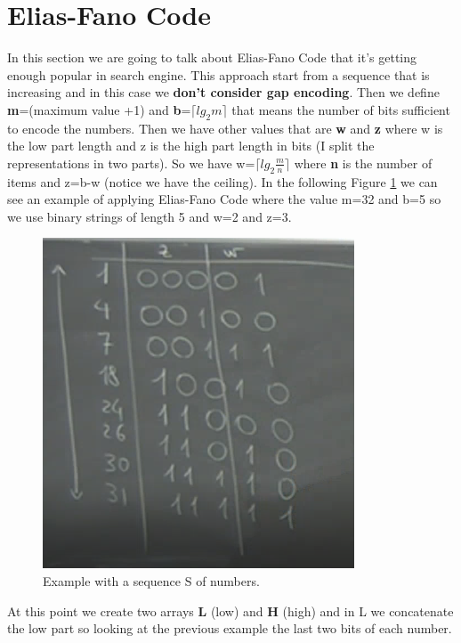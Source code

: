 \section{Elias-Fano Code}
In this section we are going to talk about Elias-Fano Code that it's getting enough popular in search engine.\newline
This approach start from a sequence that is increasing and in this case we \textbf{don't consider gap encoding}. Then we define \textbf{m}=(maximum value +1) and \textbf{b}=$\lceil lg_2m \rceil$ that means the number of bits sufficient to encode the numbers. Then we have other values that are \textbf{w} and \textbf{z} where w is the low part length and z is the high part length in bits (I split the representations in two parts). So we have w=$\lceil lg_2\frac{m}{n} \rceil$ where \textbf{n} is the number of items and z=b-w (notice we have the ceiling).\newline
In the following Figure \ref{fig:eliasfano} we can see an example of applying Elias-Fano Code where the value m=32 and b=5 so we use binary strings of length 5 and w=2 and z=3.\newline
\begin{figure}
    \centering
    \includegraphics[width=0.75\linewidth]{images/eliasfano.PNG}
    \caption{Example with a sequence S of numbers.}
    \label{fig:eliasfano}
\end{figure}
At this point we create two arrays \textbf{L} (low) and \textbf{H} (high) and in L we concatenate the low part so looking at the previous example the last two bits of each number.\newline

